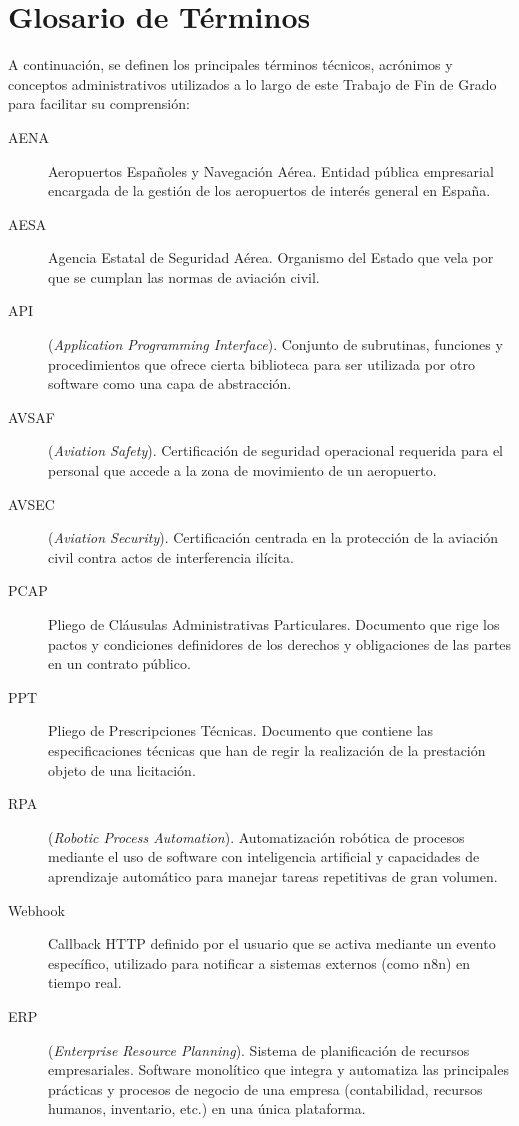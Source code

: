\chapter*{Glosario de Términos}

A continuación, se definen los principales términos técnicos, acrónimos y conceptos administrativos utilizados a lo largo de este Trabajo de Fin de Grado para facilitar su comprensión:

\begin{description}
    \item[AENA] Aeropuertos Españoles y Navegación Aérea. Entidad pública empresarial encargada de la gestión de los aeropuertos de interés general en España.
    \item[AESA] Agencia Estatal de Seguridad Aérea. Organismo del Estado que vela por que se cumplan las normas de aviación civil.
    \item[API] (\textit{Application Programming Interface}). Conjunto de subrutinas, funciones y procedimientos que ofrece cierta biblioteca para ser utilizada por otro software como una capa de abstracción.
    \item[AVSAF] (\textit{Aviation Safety}). Certificación de seguridad operacional requerida para el personal que accede a la zona de movimiento de un aeropuerto.
    \item[AVSEC] (\textit{Aviation Security}). Certificación centrada en la protección de la aviación civil contra actos de interferencia ilícita.
    \item[PCAP] Pliego de Cláusulas Administrativas Particulares. Documento que rige los pactos y condiciones definidores de los derechos y obligaciones de las partes en un contrato público.
    \item[PPT] Pliego de Prescripciones Técnicas. Documento que contiene las especificaciones técnicas que han de regir la realización de la prestación objeto de una licitación.
    \item[RPA] (\textit{Robotic Process Automation}). Automatización robótica de procesos mediante el uso de software con inteligencia artificial y capacidades de aprendizaje automático para manejar tareas repetitivas de gran volumen.
    \item[Webhook] Callback HTTP definido por el usuario que se activa mediante un evento específico, utilizado para notificar a sistemas externos (como n8n) en tiempo real.
    \item[ERP] (\textit{Enterprise Resource Planning}). Sistema de planificación de recursos empresariales. Software monolítico que integra y automatiza las principales prácticas y procesos de negocio de una empresa (contabilidad, recursos humanos, inventario, etc.) en una única plataforma.

\end{description}
